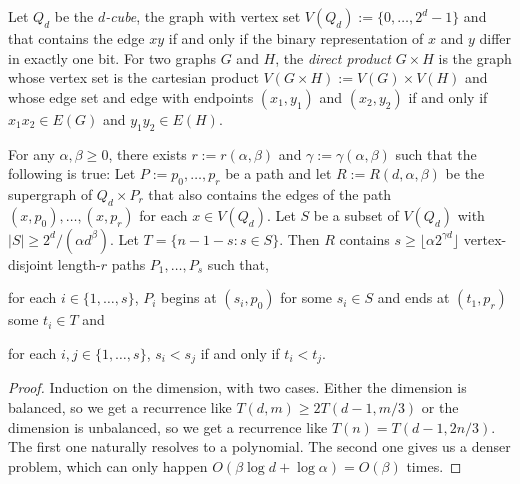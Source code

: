 \documentclass{patmorin}
\begin{document}
Let $Q_d$ be the \emph{$d$-cube}, the graph with vertex set $V(Q_d):=\{0,\ldots,2^d-1\}$ and that contains the edge $xy$ if and only if the binary representation of $x$ and $y$ differ in exactly one bit.  For two graphs $G$ and $H$, the \emph{direct product} $G\times H$ is the graph whose vertex set is the cartesian product $V(G\times H):=V(G)\times V(H)$ and whose edge set and edge with endpoints $(x_1,y_1)$ and $(x_2,y_2)$ if and only if $x_1x_2\in E(G)$ and $y_1y_2\in E(H)$.

\begin{lem}\label{routing}
    For any $\alpha,\beta \ge 0$, there exists $r:=r(\alpha,\beta)$ and $\gamma:=\gamma(\alpha,\beta)$ such that the following is true:  Let $P:=p_0,\ldots,p_r$ be a path and let $R:=R(d,\alpha,\beta)$ be the supergraph of $Q_d\times P_r$ that also contains the edges of the path $(x,p_0),\ldots,(x,p_r)$ for each $x\in V(Q_d)$.  Let $S$ be a subset of $V(Q_d)$ with $|S|\ge 2^d/(\alpha d^{\beta})$.  Let $T=\{n-1-s: s\in S\}$.  Then $R$ contains $s\ge \lfloor \alpha 2^{\gamma d}\rfloor$ vertex-disjoint length-$r$ paths $P_1,\ldots,P_s$ such that,
    \begin{compactenum}
        \item for each $i\in\{1,\ldots,s\}$, $P_i$ begins at $(s_i,p_0)$ for some $s_i\in S$ and ends at $(t_1,p_r)$ some $t_i\in T$ and
        \item for each $i,j\in\{1,\ldots,s\}$, $s_i < s_j$ if and only if $t_i < t_j$.
    \end{compactenum}
\end{lem}

\begin{proof}
    Induction on the dimension, with two cases.  Either the dimension is balanced, so we get a recurrence like $T(d,m)\ge 2T(d-1,m/3)$ or the dimension is unbalanced, so we get a recurrence like $T(n)=T(d-1,2n/3)$. The first one naturally resolves to a polynomial. The second one gives us a denser problem, which can only happen $O(\beta\log d+\log\alpha)=O(\beta)$ times.
\end{proof}
\end{document}

